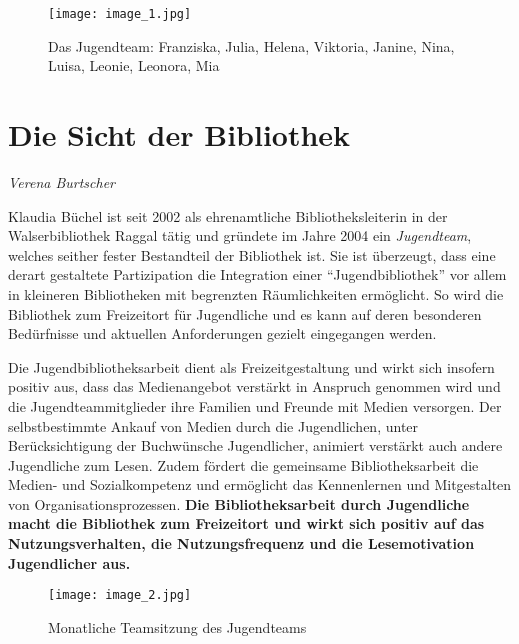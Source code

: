 \documentclass[a4paper,
fontsize=11pt,
oneside,
numbers=noperiodatend,
parskip=half-,
bibliography=totoc,
final
]{scrartcl}
\begin{document}
\begin{figure}
\centering
\texttt{[image: image\_1.jpg]}
\caption{Das Jugendteam: Franziska, Julia, Helena, Viktoria, Janine,
Nina, Luisa, Leonie, Leonora, Mia}
\end{figure}

\newpage

\hypertarget{die-sicht-der-bibliothek}{%
\section*{Die Sicht der
Bibliothek}\label{die-sicht-der-bibliothek}}

\emph{Verena Burtscher}

Klaudia Büchel ist seit 2002 als ehrenamtliche Bibliotheksleiterin in
der Walserbibliothek Raggal tätig und gründete im Jahre 2004 ein
\emph{Jugendteam}, welches seither fester Bestandteil der Bibliothek
ist. Sie ist überzeugt, dass eine derart gestaltete Partizipation die
Integration einer \enquote{Jugendbibliothek} vor allem in kleineren
Bibliotheken mit begrenzten Räumlichkeiten ermöglicht. So wird die
Bibliothek zum Freizeitort für Jugendliche und es kann auf deren
besonderen Bedürfnisse und aktuellen Anforderungen gezielt eingegangen
werden.

Die Jugendbibliotheksarbeit dient als Freizeitgestaltung und wirkt sich
insofern positiv aus, dass das Medienangebot verstärkt in Anspruch
genommen wird und die Jugendteammitglieder ihre Familien und Freunde mit
Medien versorgen. Der selbstbestimmte Ankauf von Medien durch die
Jugendlichen, unter Berücksichtigung der Buchwünsche Jugendlicher,
animiert verstärkt auch andere Jugendliche zum Lesen. Zudem fördert die
gemeinsame Bibliotheksarbeit die Medien- und Sozialkompetenz und
ermöglicht das Kennenlernen und Mitgestalten von Organisationsprozessen.
\textbf{Die Bibliotheksarbeit durch Jugendliche macht die Bibliothek zum
Freizeitort und wirkt sich positiv auf das Nutzungsverhalten, die
Nutzungsfrequenz und die Lesemotivation Jugendlicher aus.}

\begin{figure}
\centering
\texttt{[image: image\_2.jpg]}
\caption{Monatliche Teamsitzung des Jugendteams}
\end{figure}
\end{document}
